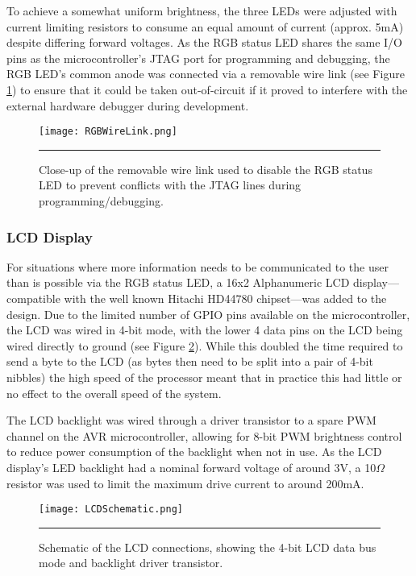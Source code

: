 To achieve a somewhat uniform brightness, the three LEDs were adjusted with current limiting resistors to consume an equal amount of current (approx. 5mA) despite differing forward voltages. As the RGB status LED shares the same I/O pins as the microcontroller's JTAG port for programming and debugging, the RGB LED's common anode was connected via a removable wire link (see Figure \ref{fig:rgbwirelink}) to ensure that it could be taken out-of-circuit if it proved to interfere with the external hardware debugger during development.

\begin{figure}[tbph]
	\centering
		\texttt{[image: RGBWireLink.png]}
	\rule{35em}{0.5pt}
	\caption[Close-up of the RGB LED's Removable Wire Link]{Close-up of the removable wire link used to disable the RGB status LED to prevent conflicts with the JTAG lines during programming/debugging.}
	\label{fig:rgbwirelink}
\end{figure}

\FloatBarrier
\subsubsection{LCD Display}

For situations where more information needs to be communicated to the user than is possible via the RGB status LED, a 16x2 Alphanumeric LCD display---compatible with the well known Hitachi HD44780 chipset---was added to the design. Due to the limited number of GPIO pins available on the microcontroller, the LCD was wired in 4-bit mode, with the lower 4 data pins on the LCD being wired directly to ground (see Figure \ref{fig:lcdschematic}). While this doubled the time required to send a byte to the LCD (as bytes then need to be split into a pair of 4-bit nibbles) the high speed of the processor meant that in practice this had little or no effect to the overall speed of the system.

The LCD backlight was wired through a driver transistor to a spare PWM channel on the AVR microcontroller, allowing for 8-bit PWM brightness control to reduce power consumption of the backlight when not in use. As the LCD display's LED backlight had a nominal forward voltage of around 3V, a 10\ensuremath{\Omega} resistor was used to limit the maximum drive current to around 200mA.

\begin{figure}[tbph]
	\centering
		\texttt{[image: LCDSchematic.png]}
	\rule{35em}{0.5pt}
	\caption[LCD Display Schematic]{Schematic of the LCD connections, showing the 4-bit LCD data bus mode and backlight driver transistor.}
	\label{fig:lcdschematic}
\end{figure}

